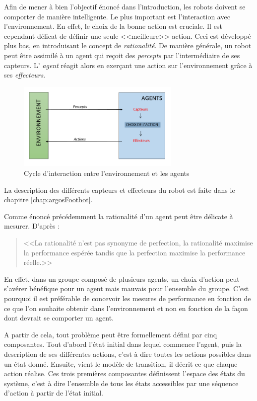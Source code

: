 Afin de mener à bien l'objectif énoncé dans l'introduction, les robots doivent se comporter de manière intelligente. Le plus important est l'interaction avec l'environnement. En effet, le choix de la bonne action est cruciale. Il est cependant délicat de définir une seule <<meilleure>> action. Ceci est développé plus bas, en introduisant le concept de \emph{rationalité}. 
De manière générale, un robot peut être assimilé à un agent qui reçoit des \emph{percepts} par l'intermédiaire de ses capteurs. L' \emph{agent} réagit alors en exerçant une action sur l'environnement grâce à ses \emph{effecteurs}.
\begin{figure}[h!]
  \centering
  \includegraphics[width=0.7\textwidth]{cycleInteractionAI.png}
    \caption{Cycle d'interaction entre l'environnement et les agents}
\end{figure}
La description des différents capteurs et effecteurs du robot est faite dans le chapitre \ref{chap:argosFootbot}.

Comme énoncé précédemment la rationalité d'un agent peut être délicate à mesurer. D'après \cite{AIBrique}:
\begin{quote}
  <<La rationalité n'est pas synonyme de perfection, la rationalité maximise la performance espérée tandis que la perfection maximise la performance réelle.>>
\end{quote}


En effet, dans un groupe composé de plusieurs agents, un choix d'action peut s'avérer bénéfique pour un agent mais mauvais pour l'ensemble du groupe. C'est pourquoi il est préférable de concevoir les mesures de performance en fonction de ce que l'on souhaite obtenir dans l'environnement et non en fonction de la façon dont devrait se comporter un agent.

A partir de cela, tout problème peut être formellement défini par cinq composantes. Tout d'abord l'état initial dans lequel commence l'agent, puis la description de ses différentes actions, c'est à dire toutes les actions possibles dans un état donné. Ensuite, vient le modèle de transition, il décrit ce que chaque action réalise. Ces trois premières composantes définissent l'espace des états du système, c'est à dire l'ensemble de tous les états accessibles par une séquence d'action à partir de l'état initial.

